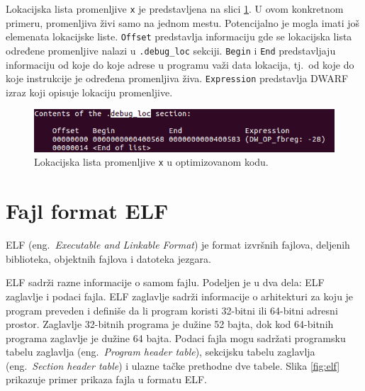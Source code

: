 \documentclass[12pt,oneside]{memoir}
\begin{document}
Lokacijska lista promenljive \texttt{x} je predstavljena na slici \ref{fig:debugLoc}. U ovom konkretnom primeru, promenljiva živi samo na jednom mestu. Potencijalno je mogla imati još elemenata lokacijske liste. \texttt{Offset} predstavlja informaciju gde se lokacijska lista određene promenljive nalazi u \texttt{.debug\_loc} sekciji. \texttt{Begin} i \texttt{End} predstavljaju informaciju od koje do koje adrese u programu važi data lokacija, tj.~od koje do koje instrukcije je određena promenljiva živa. \texttt{Expression} predstavlja DWARF izraz koji opisuje lokaciju promenljive.

\begin{figure}[h!]
	\begin{center}
		\includegraphics[scale=0.6]{slike/debugLoc.png}
	\end{center}
	\caption{Lokacijska lista promenljive \texttt{x} u optimizovanom kodu.}
	\label{fig:debugLoc}
\end{figure}

\newpage
\section{Fajl format ELF}

ELF (eng.~\emph{Executable and Linkable Format}) \cite{ELF} je format izvršnih fajlova, deljenih biblioteka, objektnih fajlova i datoteka jezgara.

ELF sadrži razne informacije o samom fajlu. Podeljen je u dva dela: ELF zaglavlje i podaci fajla. ELF zaglavlje sadrži informacije o arhitekturi za koju je program preveden i definiše da li program koristi 32-bitni ili 64-bitni adresni prostor. Zaglavlje 32-bitnih programa je dužine 52 bajta, dok kod 64-bitnih programa zaglavlje je dužine 64 bajta. Podaci fajla mogu sadržati programsku tabelu zaglavlja (eng.~\emph{Program header table}), sekcijsku tabelu zaglavlja (eng.~\emph{Section header table}) i ulazne tačke prethodne dve tabele. Slika \ref{fig:elf} prikazuje primer prikaza fajla u formatu ELF.
\end{document}
